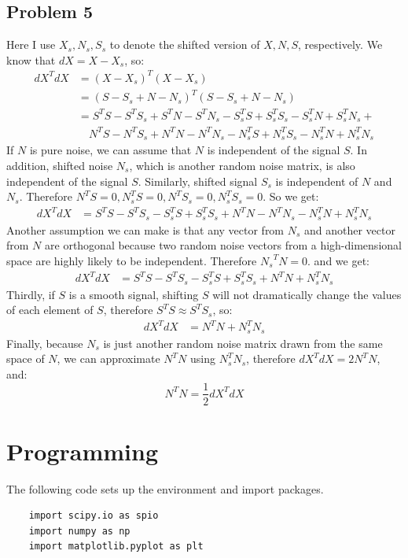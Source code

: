 \documentclass{article}
\begin{document}
\subsection*{Problem 5}
Here I use $X_s, N_s, S_s$ to denote the shifted version of $X, N, S$, respectively. We know that $dX = X-X_s$, so:
\begin{align*}
dX^T dX &= {(X-X_s)}^T{(X-X_s)} \\
&= {(S-S_s + N - N_s)}^T(S-S_s + N - N_s) \\
&= S^TS - S^T S_s + S^T N - S^T N_s - S_s^TS + S_s^T S_s - S_s^T N + S_s^T N_s +\\
&\quad N^TS - N^T S_s + N^T N - N^T N_s - N_s^TS + N_s^T S_s - N_s^T N + N_s^T N_s
\end{align*}
If $N$ is pure noise, we can assume that $N$ is independent of the signal $S$. In addition, shifted noise $N_s$, which is another random noise matrix, is also independent of the signal $S$. Similarly, shifted signal $S_s$ is independent of $N$ and $N_s$. Therefore $N^TS = 0, N_s^TS = 0, N^TS_s = 0, N_s^TS_s = 0$. So we get:
\begin{align*}
dX^T dX &= S^TS - S^T S_s - S_s^TS + S_s^T S_s + N^T N - N^T N_s - N_s^T N + N_s^T N_s
\end{align*}
Another assumption we can make is that any vector from $N_s$ and another vector from $N$ are orthogonal because two random noise vectors from a high-dimensional space are highly likely to be independent. Therefore ${N_s}^T N = 0$. and we get:
\begin{align*}
dX^T dX &= S^TS - S^T S_s - S_s^TS + S_s^T S_s + N^T N + N_s^T N_s
\end{align*}
Thirdly, if $S$ is a smooth signal, shifting $S$ will not dramatically change the values of each element of $S$, therefore $S^T S \approx S^T S_s$, so:
\begin{align*}
dX^T dX &= N^T N + N_s^T N_s
\end{align*}
Finally, because $N_s$ is just another random noise matrix drawn from the same space of $N$, we can approximate $N^T N$ using $N_s^T N_s$, therefore $dX^T dX = 2 N^T N$, and:
\begin{equation*}
N^T N = \frac{1}{2} dX^T dX
\end{equation*} 


\newpage
\section{Programming}
The following code sets up the environment and import packages.
\begin{lstlisting}
	import scipy.io as spio
	import numpy as np
	import matplotlib.pyplot as plt
\end{lstlisting}
\end{document}
